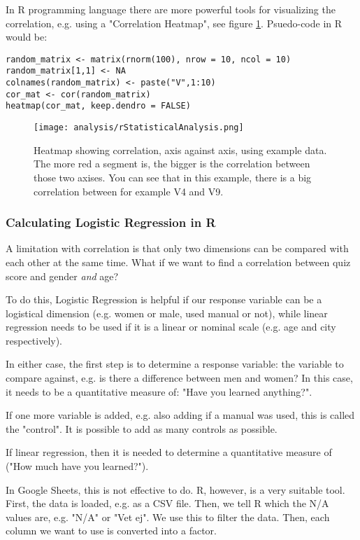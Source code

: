 In R programming language there are more powerful tools for visualizing the correlation, e.g. using a "Correlation Heatmap", see figure \ref{fig:corrHeatmap}. Psuedo-code in R would be:

\begin{verbatim}
random_matrix <- matrix(rnorm(100), nrow = 10, ncol = 10)
random_matrix[1,1] <- NA
colnames(random_matrix) <- paste("V",1:10)
cor_mat <- cor(random_matrix)
heatmap(cor_mat, keep.dendro = FALSE)
\end{verbatim}

\begin{figure}[h]
    \centering
    \texttt{[image: analysis/rStatisticalAnalysis.png]}
    \caption{Heatmap showing correlation, axis against axis, using example data. The more red a segment is, the bigger is the correlation between those two axises. You can see that in this example, there is a big correlation between for example V4 and V9.}
    \label{fig:corrHeatmap}
\end{figure}

\subsubsection{Calculating Logistic Regression in R}

A limitation with correlation is that only two dimensions can be compared with each other at the same time. What if we want to find a correlation between quiz score and gender \textit{and} age?

To do this, Logistic Regression is helpful if our response variable can be a logistical dimension (e.g. women or male, used manual or not), while linear regression needs to be used if it is a linear or nominal scale (e.g. age and city respectively).

In either case, the first step is to determine a response variable: the variable to compare against, e.g. is there a difference between men and women? In this case, it needs to be a quantitative measure of: "Have you learned anything?".

If one more variable is added, e.g. also adding if a manual was used, this is called the "control". It is possible to add as many controls as possible.

If linear regression, then it is needed to determine a quantitative measure of ("How much have you learned?").

In Google Sheets, this is not effective to do. R, however, is a very suitable tool. First, the data is loaded, e.g. as a CSV file. Then, we tell R which the N/A values are, e.g. "N/A" or "Vet ej". We use this to filter the data. Then, each column we want to use is converted into a factor.

